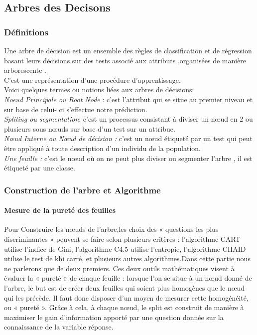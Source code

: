 \subsection{Arbres des Decisons \cite{TreeBk1} \cite{TreeAV}}
\subsubsection{Définitions}
Une arbre de décision est un ensemble des règles de classification et de régression basant leurs décisions sur des tests associé aux attributs ,organisées de manière arborescente .\\
C'est une représentation d'une procédure d'apprentissage.\\
Voici quelques termes ou notions liées aux arbres de décisions:
\\
\emph{Noeud Principale ou Root Node} : c'est l'attribut qui se situe au premier niveau et sur base de celui- ci s'effectue notre prédiction.\\
\emph{Spliting ou segmentation}: c'est un processus consistant à diviser un nœud en 2 ou plusieurs sous nœuds sur base d'un test sur un attribue.\\
\emph{Nœud Interne ou Nœud de décision : } c'est un nœud étiqueté par un test qui peut être appliqué à toute description d'un individu de la population.\\
\emph{Une feuille :}
c'est le nœud où on ne peut plus diviser  ou segmenter l'arbre , il est étiqueté par une classe.
\subsubsection{Construction de l'arbre et Algorithme}
\paragraph{Mesure de la pureté des feuilles}
Pour Construire les nœuds de l'arbre,les  choix des « questions les plus discriminantes »  peuvent  se faire selon plusieurs critères : l’algorithme CART utilise l’indice de Gini, l’algorithme C4.5 utilise l’entropie, l'algorithme \ac{CHAID} utilise le test de khi carré, et plusieurs autres algorithmes.Dans cette partie nous ne parlerons que de deux premiers. Ces deux outils mathématiques visent à évaluer la « pureté » de chaque feuille : lorsque l’on se situe à un nœud donné de l’arbre, le but est de créer deux feuilles qui soient plus homogènes que le nœud qui
les précède. Il faut donc disposer d’un moyen de mesurer cette homogénéité, ou « pureté ». Grâce
à cela, à chaque nœud, le split est construit de manière à maximiser le gain d’information apporté
par une question donnée sur la connaissance de la variable réponse.
